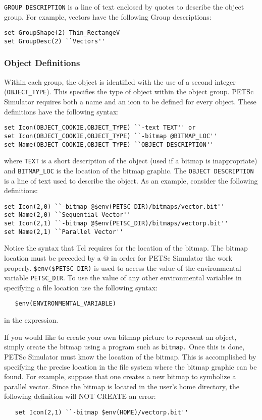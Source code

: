 {\tt GROUP DESCRIPTION} is a line of text enclosed by quotes to describe the object group.  For example, vectors have the following Group descriptions:
\begin{verbatim}
set GroupShape(2) Thin_RectangeV 
set GroupDesc(2) ``Vectors''
\end{verbatim}

\subsubsection{Object Definitions}

Within each group, the object is identified with the use of a second integer ({\tt OBJECT\_TYPE}).  This specifies the type of object within the object group.  PETSc Simulator requires both a name and an icon to be defined for every object.  These definitions have the following syntax:
\begin{verbatim}
set Icon(OBJECT_COOKIE,OBJECT_TYPE) ``-text TEXT'' or 
set Icon(OBJECT_COOKIE,OBJECT_TYPE) ``-bitmap @BITMAP_LOC'' 
set Name(OBJECT_COOKIE,OBJECT_TYPE) ``OBJECT DESCRIPTION''
\end{verbatim}
where {\tt TEXT} is a short description of the object (used if a bitmap is inappropriate) and {\tt BITMAP\_LOC} is the location of the bitmap graphic.  The {\tt OBJECT DESCRIPTION} is a line of text used to describe the object.  As an example, consider the following definitions:
\begin{verbatim}
set Icon(2,0) ``-bitmap @$env(PETSC_DIR)/bitmaps/vector.bit'' 
set Name(2,0) ``Sequential Vector'' 
set Icon(2,1) ``-bitmap @$env(PETSC_DIR)/bitmaps/vectorp.bit'' 
set Name(2,1) ``Parallel Vector''
\end{verbatim}
Notice the syntax that Tcl requires for the location of the bitmap.  The bitmap location must be preceded by a $@$ in order for PETSc Simulator the work properly.   {\tt \$env(\$PETSC\_DIR)} is used to access the value of the environmental variable {\tt PETSC\_DIR}.  To use the value of any other environmental variables in specifying a file location use the following syntax:
\begin{verbatim}
   $env(ENVIRONMENTAL_VARIABLE)
\end{verbatim}
in the expression.

If you would like to create your own bitmap picture to represent an
object, simply create the bitmap using a program such as {\tt bitmap.}
Once this is done, PETSc Simulator must know the location of the
bitmap.  This is accomplished by specifying the precise location in
the file system where the bitmap graphic can be found.  For example,
suppose that one creates a new bitmap to symbolize a parallel vector.
Since the bitmap is located in the user's home directory, the
following definition will NOT CREATE an error:
\begin{verbatim}
   set Icon(2,1) ``-bitmap $env(HOME)/vectorp.bit''
\end{verbatim}

